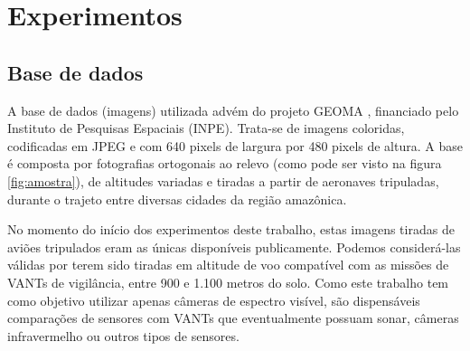 \chapter{Experimentos}\label{cap:experimentos}

\section{Base de dados}

A base de dados (imagens) utilizada advém do projeto GEOMA \cite{geoma}, financiado pelo Instituto de Pesquisas Espaciais (INPE). Trata-se de imagens coloridas, codificadas em JPEG e com 640 pixels de largura por 480 pixels de altura. A base é composta por fotografias ortogonais ao relevo (como pode ser visto na figura \ref{fig:amostra}), de altitudes variadas e tiradas a partir de aeronaves tripuladas, durante o trajeto entre diversas cidades da região amazônica.

No momento do início dos experimentos deste trabalho, estas imagens tiradas de aviões tripulados eram as únicas disponíveis publicamente. Podemos considerá-las válidas por terem sido tiradas em altitude de voo compatível com as missões de VANTs de vigilância, entre 900 e 1.100 metros do solo. Como este trabalho tem como objetivo utilizar apenas câmeras de espectro visível, são dispensáveis comparações de sensores com VANTs que eventualmente possuam sonar, câmeras infravermelho ou outros tipos de sensores.


